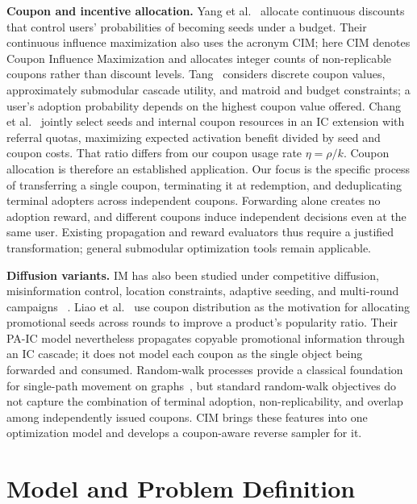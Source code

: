 \documentclass[sigconf,balance=false]{acmart}
\begin{document}
\textbf{Coupon and incentive allocation.}
Yang et al.~\cite{yang2016continuous} allocate continuous discounts that
control users' probabilities of becoming seeds under a budget.
Their continuous influence maximization also uses the acronym CIM;
here CIM denotes Coupon Influence Maximization and allocates integer
counts of non-replicable coupons rather than discount levels.
Tang~\cite{tang2018coupon} considers discrete coupon values, approximately
submodular cascade utility, and matroid and budget constraints; a user's
adoption probability depends on the highest coupon value offered.
Chang et al.~\cite{chang2019socialcoupon} jointly select seeds and internal
coupon resources in an IC extension with referral quotas, maximizing
expected activation benefit divided by seed and coupon costs.
That ratio differs from our coupon usage rate $\eta=\rho/k$.
Coupon allocation is therefore an established application. Our focus is
the specific process of transferring a single coupon, terminating it at
redemption, and deduplicating terminal adopters across independent coupons.
Forwarding alone creates no adoption reward, and different coupons induce
independent decisions even at the same user. Existing propagation and
reward evaluators thus require a justified transformation; general
submodular optimization tools remain applicable.

\textbf{Diffusion variants.}
IM has also been studied under competitive diffusion, misinformation
control, location constraints, adaptive seeding, and multi-round
campaigns
~\cite{budak2011limiting,li2014efficient,lu2015competition,seeman2013adaptive,sun2018multi}.
Liao et
al.~\cite{liao2023popularity} use coupon distribution as the motivation
for allocating promotional seeds across rounds to improve a product's
popularity ratio.
Their PA-IC model nevertheless propagates copyable promotional
information through an IC cascade; it does not model each coupon as the
single object being forwarded and consumed.
Random-walk processes provide a classical foundation for single-path
movement on graphs~\cite{lovasz1993random}, but standard random-walk
objectives do not capture the combination of terminal adoption,
non-replicability, and overlap among independently issued coupons.
CIM brings these features into one optimization model and develops a
coupon-aware reverse sampler for it.

\section{Model and Problem Definition}
\label{sec:model}
\end{document}
